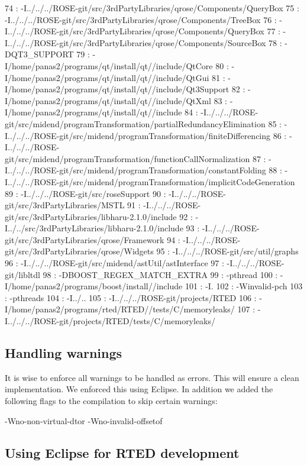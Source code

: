   74 : -I../../../ROSE-git/src/3rdPartyLibraries/qrose/Components/QueryBox
  75 : -I../../../ROSE-git/src/3rdPartyLibraries/qrose/Components/TreeBox
  76 : -I../../../ROSE-git/src/3rdPartyLibraries/qrose/Components/QueryBox
  77 : -I../../../ROSE-git/src/3rdPartyLibraries/qrose/Components/SourceBox
  78 : -DQT3_SUPPORT
  79 : -I/home/panas2/programs/qt/install/qt//include/QtCore
  80 : -I/home/panas2/programs/qt/install/qt//include/QtGui
  81 : -I/home/panas2/programs/qt/install/qt//include/Qt3Support
  82 : -I/home/panas2/programs/qt/install/qt//include/QtXml
  83 : -I/home/panas2/programs/qt/install/qt//include
  84 : -I../../../ROSE-git/src/midend/programTransformation/partialRedundancyElimination
  85 : -I../../../ROSE-git/src/midend/programTransformation/finiteDifferencing
  86 : -I../../../ROSE-git/src/midend/programTransformation/functionCallNormalization
  87 : -I../../../ROSE-git/src/midend/programTransformation/constantFolding
  88 : -I../../../ROSE-git/src/midend/programTransformation/implicitCodeGeneration
  89 : -I../../../ROSE-git/src/roseSupport
  90 : -I../../../ROSE-git/src/3rdPartyLibraries/MSTL
  91 : -I../../../ROSE-git/src/3rdPartyLibraries/libharu-2.1.0/include
  92 : -I../../src/3rdPartyLibraries/libharu-2.1.0/include
  93 : -I../../../ROSE-git/src/3rdPartyLibraries/qrose/Framework
  94 : -I../../../ROSE-git/src/3rdPartyLibraries/qrose/Widgets
  95 : -I../../../ROSE-git/src/util/graphs
  96 : -I../../../ROSE-git/src/midend/astUtil/astInterface
  97 : -I../../../ROSE-git/libltdl
  98 : -DBOOST_REGEX_MATCH_EXTRA
  99 : -pthread
  100 : -I/home/panas2/programs/boost/install//include
  101 : -I.
  102 : -Winvalid-pch
  103 : -pthreads
  104 : -I../..
  105 : -I../../../ROSE-git/projects/RTED
  106 : -I/home/panas2/programs/rted/RTED//tests/C/memoryleaks/
  107 : -I../../../ROSE-git/projects/RTED/tests/C/memoryleaks/

\subsection{Handling warnings}

It is wise to enforce all warnings to be handled as errors. This will ensure a clean implementation. We enforced this using Eclipse.
In addition we added the following flags to the compilation to skip certain warnings:

  -Wno-non-virtual-dtor -Wno-invalid-offsetof 

\subsection{Using Eclipse for RTED development}

